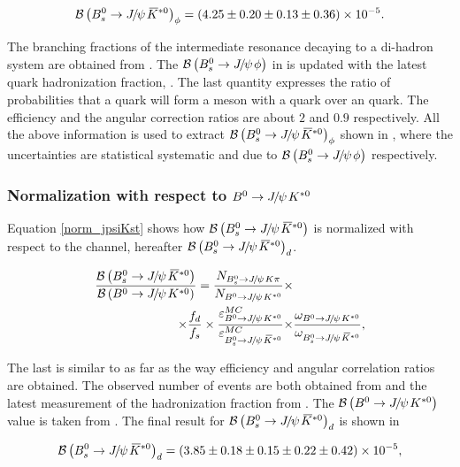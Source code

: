 \begin{equation}
  \centering
\BRof\BsJpsiKst_{\phi} = (4.25 \pm 0.20 \pm 0.13 \pm 0.36) \times 10^{-5}.
\label{Br_JpsiPhi}
\end{equation}

\noindent The branching fractions of the intermediate resonance decaying to a di-hadron system are obtained from \cite{PDG}.
The $\BRof\BsJpsiPhi$ in \cite{SheldonKK} is updated with the latest \bquark quark hadronization
fraction, \fdfs \cite{LHCb-CONF-2013-011}. The last quantity expresses the ratio of probabilities that a \bquark quark will form a meson with a
\dquark quark over an \squark quark. The efficiency and the angular correction ratios are about $2$ and $0.9$ respectively.
All the above information is used to extract $\BRof{\BsJpsiKst}_\phi$ shown in , where the uncertainties
are statistical systematic and due to  $\BRof\BsJpsiPhi$ respectively.

\subsubsection{Normalization with respect to $\BdJpsiKst$}
Equation \ref{norm_jpsiKst} shows how $\BRof\BsJpsiKst$ is normalized with respect to the \BdJpsiKst channel, hereafter $\BRof{\BsJpsiKst}_d$.

\begin{align}
  \centering
\frac{\BRof\BsJpsiKst}{\BRof\BdJpsiKst} = \frac{N_{\BsJpsiKpi}}{N_{\BdJpsiKst}} \times & \nonumber \\
                                   \times \fdfs
                                   \times \frac{\varepsilon_{\BdJpsiKst}^{MC}}{\varepsilon_{\BsJpsiKst}^{MC}}
                                   \times &\frac{\omega_{\BdJpsiKst}}{\omega_{\BsJpsiKst}},
\label{norm_jpsiKst}
\end{align}

\noindent The last is similar to  as far as the way efficiency and angular correlation ratios are obtained.
The observed number of events are both obtained from  and the latest measurement of the hadronization
fraction from \cite{LHCb-CONF-2013-011}. The $\BRof\BdJpsiKst$ value is taken from \cite{Abe:2002haa}. The final result for $\BRof{\BsJpsiKst}_d$
is shown in 

\begin{equation}
  \centering
\BRof\BsJpsiKst_{d} = (3.85 \pm 0.18 \pm 0.15 \pm 0.22 \pm 0.42 )\times 10^{-5},
\label{Br_JpsiKst}
\end{equation}

